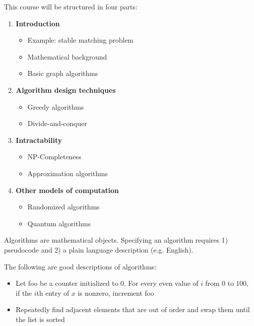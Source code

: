 \documentclass[12pt]{scrartcl}
\begin{document}
This course will be structured in four parts:
    \begin{enumerate}
        \item \textbf{Introduction}
            \begin{itemize}
                \item Example: stable matching problem
                \item Mathematical background
                \item Basic graph algorithms
            \end{itemize}
        \item \textbf{Algorithm design techniques}
            \begin{itemize}
                \item Greedy algorithms
                \item Divide-and-conquer
            \end{itemize}
        \item \textbf{Intractability}
            \begin{itemize}
                \item NP-Completeness
                \item Approximation algorithms
            \end{itemize}
        \item \textbf{Other models of computation}
            \begin{itemize}
                \item Randomized algorithms
                \item Quantum algorithms
            \end{itemize}
    \end{enumerate}

    Algorithms are mathematical objects. Specifying an algorithm requires 1) pseudocode and 2) a plain language description (e.g. English).

    \begin{example}
        The following are good descriptions of algorithms:
            \begin{itemize}
                \item Let foo be a counter initialized to $0$. For every even value of $i$ from $0$ to $100$, if the $i$th entry of $x$ is nonzero, increment foo

                \item Repeatedly find adjacent elements that are out of order and swap them until the list is sorted
            \end{itemize}
    \end{example}
\end{document}
